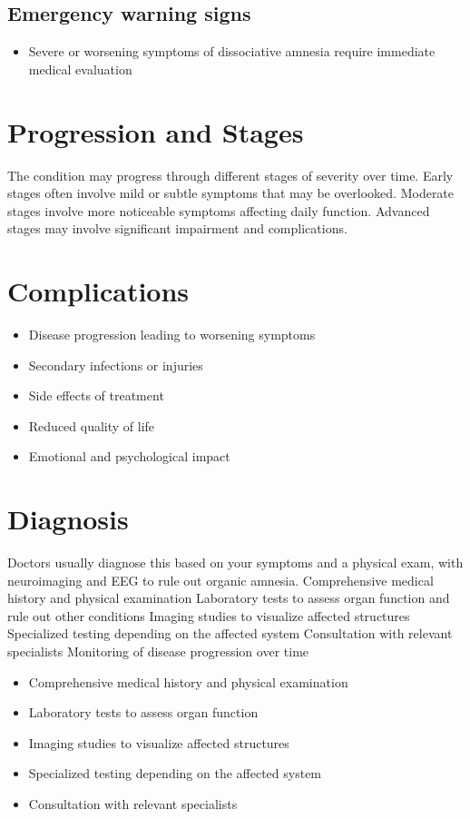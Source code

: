 \subsection{Emergency warning signs}
\begin{itemize}[noitemsep]
  \item Severe or worsening symptoms of dissociative amnesia require immediate medical evaluation
\end{itemize}
\section{Progression and Stages}
The condition may progress through different stages of severity over time. Early stages often involve mild or subtle symptoms that may be overlooked. Moderate stages involve more noticeable symptoms affecting daily function. Advanced stages may involve significant impairment and complications.
\section{Complications}
\begin{itemize}[noitemsep]
  \item Disease progression leading to worsening symptoms
  \item Secondary infections or injuries
  \item Side effects of treatment
  \item Reduced quality of life
  \item Emotional and psychological impact
\end{itemize}
\section{Diagnosis}
Doctors usually diagnose this based on your symptoms and a physical exam, with neuroimaging and EEG to rule out organic amnesia. Comprehensive medical history and physical examination Laboratory tests to assess organ function and rule out other conditions Imaging studies to visualize affected structures Specialized testing depending on the affected system Consultation with relevant specialists Monitoring of disease progression over time

\begin{itemize}[noitemsep]
  \item Comprehensive medical history and physical examination
  \item Laboratory tests to assess organ function
  \item Imaging studies to visualize affected structures
  \item Specialized testing depending on the affected system
  \item Consultation with relevant specialists
\end{itemize}
